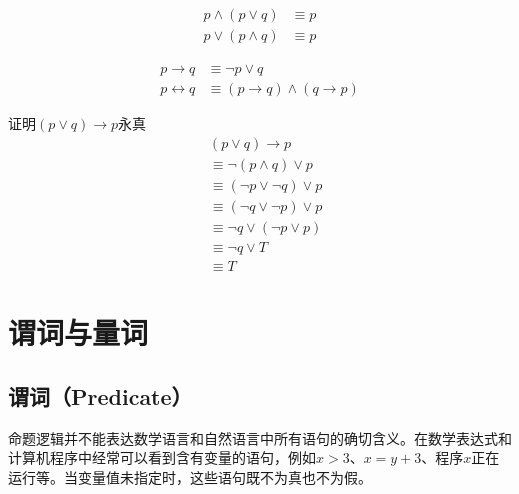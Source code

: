 \documentclass[12pt, openany, oneside]{book}
\begin{document}
\begin{tcolorbox}
    \begin{align}
        p \wedge (p \vee q) & \equiv p \\
        p \vee (p \wedge q) & \equiv p
    \end{align}
\end{tcolorbox}

\begin{tcolorbox}
    \begin{align}
        p \rightarrow q     & \equiv \neg p \vee q                              \\
        p \leftrightarrow q & \equiv (p \rightarrow q) \wedge (q \rightarrow p)
    \end{align}
\end{tcolorbox}

\begin{tcolorbox}\nonumber
    证明$ (p \vee q) \rightarrow p $永真
    \begin{align}
         & (p \vee q) \rightarrow p           \\
         & \equiv \neg (p \wedge q) \vee p    \\
         & \equiv (\neg p \vee \neg q) \vee p \\
         & \equiv (\neg q \vee \neg p) \vee p \\
         & \equiv \neg q \vee (\neg p \vee p) \\
         & \equiv \neg q \vee T               \\
         & \equiv T
    \end{align}
\end{tcolorbox}

\newpage

\section{谓词与量词}

\subsection{谓词（Predicate）}

命题逻辑并不能表达数学语言和自然语言中所有语句的确切含义。在数学表达式和计算机程序中经常可以看到含有变量的语句，例如$ x > 3 $、$ x = y + 3 $、程序$ x $正在运行等。当变量值未指定时，这些语句既不为真也不为假。 \\
\end{document}

